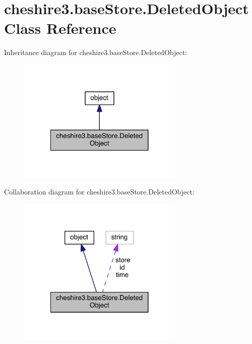 \hypertarget{classcheshire3_1_1base_store_1_1_deleted_object}{\section{cheshire3.\-base\-Store.\-Deleted\-Object Class Reference}
\label{classcheshire3_1_1base_store_1_1_deleted_object}
}


Inheritance diagram for cheshire3.\-base\-Store.\-Deleted\-Object\-:
\nopagebreak
\begin{figure}[H]
\begin{center}
\leavevmode
\includegraphics[width=224pt]{classcheshire3_1_1base_store_1_1_deleted_object__inherit__graph}
\end{center}
\end{figure}


Collaboration diagram for cheshire3.\-base\-Store.\-Deleted\-Object\-:
\nopagebreak
\begin{figure}[H]
\begin{center}
\leavevmode
\includegraphics[width=224pt]{classcheshire3_1_1base_store_1_1_deleted_object__coll__graph}
\end{center}
\end{figure}
